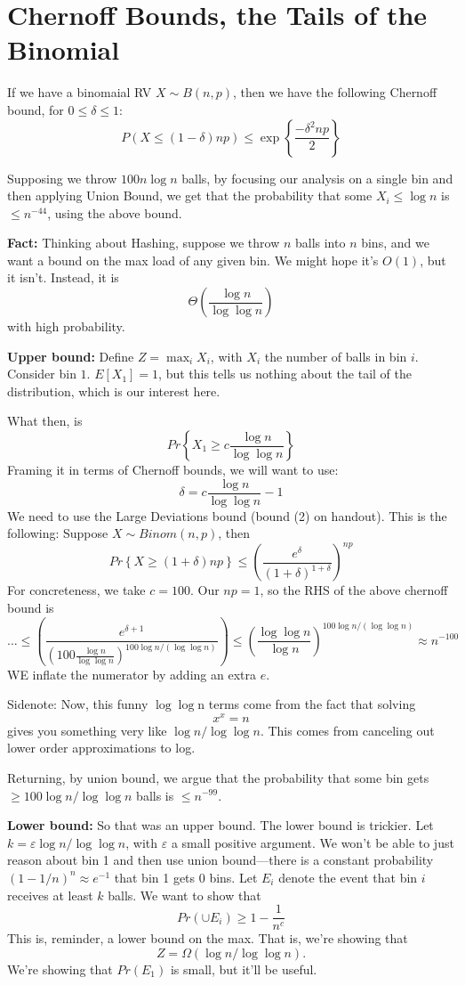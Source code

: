 \documentclass{article}
\begin{document}
\section{Chernoff Bounds, the Tails of the Binomial}

If we have a  binomaial RV $X\sim B(n,p)$, then we have the following
 Chernoff bound, for $0\leq \delta \leq 1$:
$$
P(X\leq (1-\delta) np) \leq
\exp\left\{
	\frac{-\delta^2 np} {2}
\right\}
$$

Supposing we throw $100 n\log n$ balls, by focusing our analysis on a single bin
and then applying Union Bound, we get that the probability that 
some $X_i \leq \log n$ is $\leq n^{-44}$, using the above bound.

\textbf{Fact:}
Thinking about Hashing, suppose we throw $n$ balls into $n$ bins, and we want a bound on the max load of any given bin.
We might hope it's $O(1)$, but it isn't.
Instead, it is
$$
\Theta\left(
	\frac{\log n} {\log \log n}
\right)
$$
with high probability.

\textbf{Upper bound:}
Define $Z = \max_i X_i$, with $X_i$ the number of balls in bin $i$.
Consider bin $1$.
$E[X_1] = 1$, but this tells us nothing about the tail of the distribution,
which is our interest here.

What then, is
$$
Pr\left\{
	X_1 \geq c\frac{\log n}{ \log\log n}
\right\}
$$
Framing it in terms of Chernoff bounds, we will want to use:
$$
\delta = c\frac{\log n}{ \log\log n} - 1 
$$
We need to use the Large Deviations bound (bound (2) on handout).
This is the following:
Suppose $X\sim Binom(n,p)$, then
$$
Pr\left\{
	X\geq (1 + \delta) np
\right\}
\leq
\left(
	\frac{e^\delta}{(1+\delta)^{1+\delta}}
\right)
^{np}
$$
For concreteness, we take $c=100$.
Our $np=1$, so the RHS of the above chernoff bound is
$$
... \leq
\left(
\frac{e^{\delta + 1}}
{	\left(100 \frac{\log n}{\log \log n} \right) ^ {100 \log n / (\log \log n)}}
\right) 
\leq
\left(
	\frac{\log\log n}{\log n}
\right) ^ {100 \log n / (\log \log n)}
\approx
n^{-100}
$$
WE inflate the numerator by adding an extra $e$.

Sidenote:
Now, this funny $\log\log $n terms come from the fact that solving
$$
x^x = n
$$
gives you something very like $\log n / \log\log n$.
This comes from canceling out lower order approximations to log.

Returning, by union bound, we argue that the probability that some bin gets $\geq 100 \log n / \log\log n$ balls is $\leq n^{-99}$.

\textbf{Lower bound:}
So that was an upper bound. The lower bound is trickier.
Let $k = \varepsilon \log n / \log\log n$, with $\varepsilon$ a small positive argument.
We won't be able to just reason about bin 1 and then use union bound---there is a constant probability $(1 - 1/n)^n \approx e^{-1}$ that bin 1 gets 0 bins.
Let $E_i$ denote the event that bin $i$ receives at least $k$ balls.
We want to show that
$$
Pr(\cup E_i) \geq 1 - \frac{1}{n^c}
$$
This is, reminder, a lower bound on the max.
That is, we're showing that
$$
Z = \Omega(\log n / \log\log n).
$$
We're showing that $Pr(E_1)$ is small, but it'll be useful.
\end{document}
